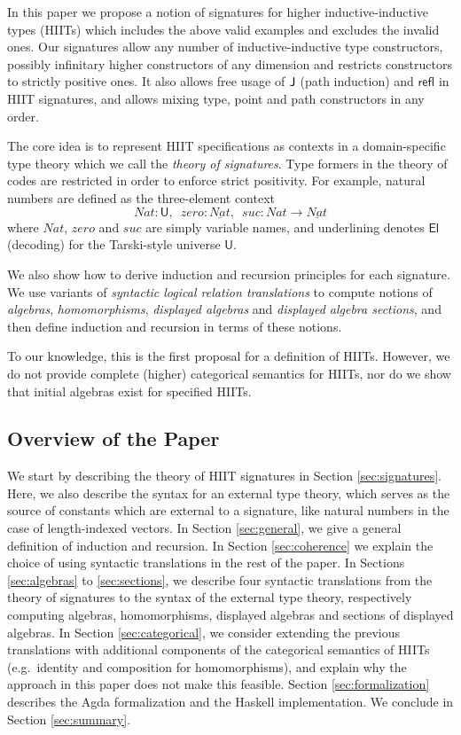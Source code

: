 \documentclass[dvipsnames]{lmcs} %
\newcommand{\U}{\mathsf{U}}
\newcommand{\El}{\mathsf{El}}
\newcommand{\ra}{\rightarrow}
\newcommand{\refl}{\mathsf{refl}}
\newcommand{\1}{\mathsf{1}} \renewcommand{\Pr}{\mathsf{Pr}}
\theoremstyle{plain}\newtheorem{satz}[thm]{Satz} %
\begin{document}
In this paper we propose a notion of signatures for higher inductive-inductive
types (HIITs) which includes the above valid examples and excludes the invalid
ones. Our signatures allow any number of inductive-inductive type constructors,
possibly infinitary higher constructors of any dimension and restricts
constructors to strictly positive ones. It also allows free usage of $\mathsf{J}$ (path
induction) and $\refl$ in HIIT signatures, and allows mixing type, point and path
constructors in any order.

The core idea is to represent HIIT specifications as contexts in a
domain-specific type theory which we call the \emph{theory of signatures}. Type
formers in the theory of codes are restricted in order to enforce strict
positivity. For example, natural numbers are defined as the three-element
context
\[
  Nat:\U,\,\,\, zero:\underline{Nat},\,\,\, suc : Nat \ra \underline{Nat}
\]
where $Nat$, $zero$ and $suc$ are simply variable names, and underlining
denotes $\El$ (decoding) for the Tarski-style universe $\U$.

We also show how to derive induction and recursion principles for each
signature. We use variants of \emph{syntactic logical relation translations} to
compute notions of \emph{algebras}, \emph{homomorphisms}, \emph{displayed
  algebras} and \emph{displayed algebra sections}, and then define induction and
recursion in terms of these notions.

To our knowledge, this is the first proposal for a definition of
HIITs. However, we do not provide complete (higher) categorical semantics
for HIITs, nor do we show that initial algebras exist for specified HIITs.

\subsection{Overview of the Paper}

We start by describing the theory of HIIT signatures in Section
\ref{sec:signatures}. Here, we also describe the syntax for an external type
theory, which serves as the source of constants which are external to a
signature, like natural numbers in the case of length-indexed vectors. In
Section \ref{sec:general}, we give a general definition of induction and
recursion. In Section \ref{sec:coherence} we explain the choice of using
syntactic translations in the rest of the paper. In Sections \ref{sec:algebras}
to \ref{sec:sections}, we describe four syntactic translations from the theory
of signatures to the syntax of the external type theory, respectively computing
algebras, homomorphisms, displayed algebras and sections of displayed
algebras. In Section \ref{sec:categorical}, we consider extending the previous
translations with additional components of the categorical semantics of HIITs
(e.g.\ identity and composition for homomorphisms), and explain why the approach
in this paper does not make this feasible. Section \ref{sec:formalization}
describes the Agda formalization and the Haskell implementation. We conclude in
Section \ref{sec:summary}.
\end{document}

